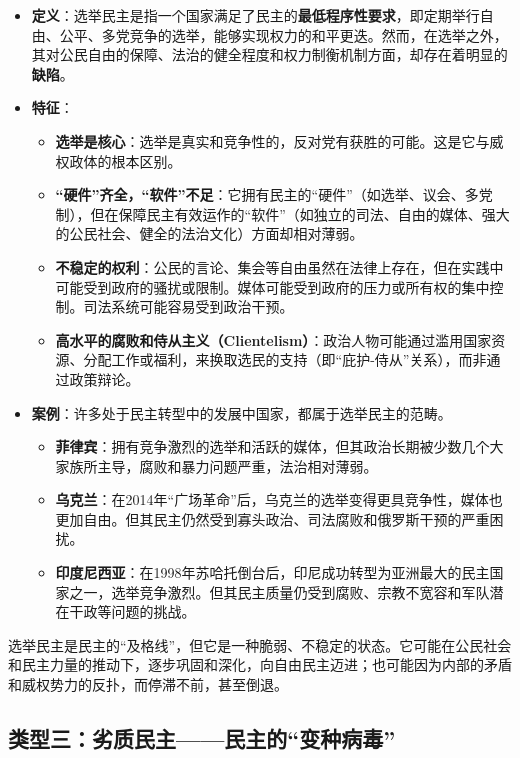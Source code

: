 \begin{itemize}
    \item \textbf{定义}：选举民主是指一个国家满足了民主的\textbf{最低程序性要求}，即定期举行自由、公平、多党竞争的选举，能够实现权力的和平更迭。然而，在选举之外，其对公民自由的保障、法治的健全程度和权力制衡机制方面，却存在着明显的\textbf{缺陷}。
    \item \textbf{特征}：
    \begin{itemize}
        \item \textbf{选举是核心}：选举是真实和竞争性的，反对党有获胜的可能。这是它与威权政体的根本区别。
        \item \textbf{“硬件”齐全，“软件”不足}：它拥有民主的“硬件”（如选举、议会、多党制），但在保障民主有效运作的“软件”（如独立的司法、自由的媒体、强大的公民社会、健全的法治文化）方面却相对薄弱。
        \item \textbf{不稳定的权利}：公民的言论、集会等自由虽然在法律上存在，但在实践中可能受到政府的骚扰或限制。媒体可能受到政府的压力或所有权的集中控制。司法系统可能容易受到政治干预。
        \item \textbf{高水平的腐败和侍从主义（Clientelism）}：政治人物可能通过滥用国家资源、分配工作或福利，来换取选民的支持（即“庇护-侍从”关系），而非通过政策辩论。
    \end{itemize}
    \item \textbf{案例}：许多处于民主转型中的发展中国家，都属于选举民主的范畴。
    \begin{itemize}
        \item \textbf{菲律宾}：拥有竞争激烈的选举和活跃的媒体，但其政治长期被少数几个大家族所主导，腐败和暴力问题严重，法治相对薄弱。
        \item \textbf{乌克兰}：在2014年“广场革命”后，乌克兰的选举变得更具竞争性，媒体也更加自由。但其民主仍然受到寡头政治、司法腐败和俄罗斯干预的严重困扰。
        \item \textbf{印度尼西亚}：在1998年苏哈托倒台后，印尼成功转型为亚洲最大的民主国家之一，选举竞争激烈。但其民主质量仍受到腐败、宗教不宽容和军队潜在干政等问题的挑战。
    \end{itemize}
\end{itemize}

选举民主是民主的“及格线”，但它是一种脆弱、不稳定的状态。它可能在公民社会和民主力量的推动下，逐步巩固和深化，向自由民主迈进；也可能因为内部的矛盾和威权势力的反扑，而停滞不前，甚至倒退。

\subsection{类型三：劣质民主——民主的“变种病毒”}

